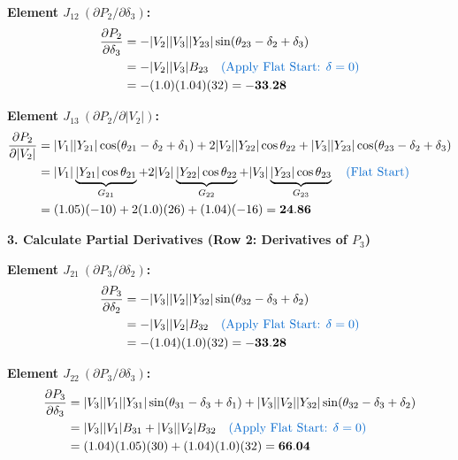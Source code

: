 \documentclass[11pt]{article}
\begin{document}
\begin{stepbox}
\noindent \textbf{Element $J_{12} \ (\partial P_2 / \partial \delta_3)$:}
\begin{align*}
    \frac{\partial P_2}{\partial \delta_3} &= -|V_2||V_3||Y_{23}|\sin(\theta_{23} - \delta_2 + \delta_3) \\
    &= -|V_2||V_3|B_{23} \quad \text{\textcolor{mainblue}{(Apply Flat Start: $\delta=0$)}} \\
    &= -(1.0)(1.04)(32) = \mathbf{-33.28}
\end{align*}

\noindent \textbf{Element $J_{13} \ (\partial P_2 / \partial |V_2|)$:}
\begin{align*}
    \frac{\partial P_2}{\partial |V_2|} &= |V_1||Y_{21}|\cos(\theta_{21} - \delta_2 + \delta_1) + 2|V_2||Y_{22}|\cos\theta_{22} + |V_3||Y_{23}|\cos(\theta_{23} - \delta_2 + \delta_3) \\
    &= |V_1|\underbrace{|Y_{21}|\cos\theta_{21}}_{G_{21}} + 2|V_2|\underbrace{|Y_{22}|\cos\theta_{22}}_{G_{22}} + |V_3|\underbrace{|Y_{23}|\cos\theta_{23}}_{G_{23}} \quad \text{\textcolor{mainblue}{(Flat Start)}} \\
    &= (1.05)(-10) + 2(1.0)(26) + (1.04)(-16) = \mathbf{24.86}
\end{align*}

\vspace{0.3cm}
\textbf{3. Calculate Partial Derivatives (Row 2: Derivatives of $P_3$)}

\noindent \textbf{Element $J_{21} \ (\partial P_3 / \partial \delta_2)$:}
\begin{align*}
    \frac{\partial P_3}{\partial \delta_2} &= -|V_3||V_2||Y_{32}|\sin(\theta_{32} - \delta_3 + \delta_2) \\
    &= -|V_3||V_2|B_{32} \quad \text{\textcolor{mainblue}{(Apply Flat Start: $\delta=0$)}} \\
    &= -(1.04)(1.0)(32) = \mathbf{-33.28}
\end{align*}

\noindent \textbf{Element $J_{22} \ (\partial P_3 / \partial \delta_3)$:}
\begin{align*}
    \frac{\partial P_3}{\partial \delta_3} &= |V_3||V_1||Y_{31}|\sin(\theta_{31} - \delta_3 + \delta_1) + |V_3||V_2||Y_{32}|\sin(\theta_{32} - \delta_3 + \delta_2) \\
    &= |V_3||V_1|B_{31} + |V_3||V_2|B_{32} \quad \text{\textcolor{mainblue}{(Apply Flat Start: $\delta=0$)}} \\
    &= (1.04)(1.05)(30) + (1.04)(1.0)(32) = \mathbf{66.04}
\end{align*}


\end{stepbox}
\end{document}
